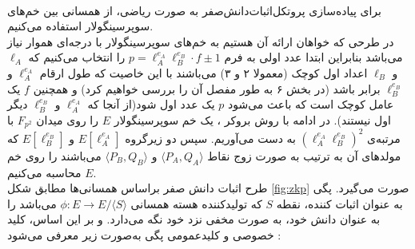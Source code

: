 \\
برای پیاده‌سازی پروتکل‌اثبات‌دانش‌صفر به صورت ریاضی، از همسانی بین  خم‌های سوپرسینگولار استفاده می‌کنیم.  
\\
در طرحی که خواهان ارائه آن هستیم به خم‌های سوپرسینگولار با درجه‌ای هموار
 نیاز می‌باشد بنابراین ابتدا  عدد اولی به فرم 
$p = \ell_A^{e_A} \ell_B^{e_B} \cdot f \pm 1$
را انتخاب می‌کنیم که 
$\ell_A$
و
$\ell_B$
اعداد اول کوچک (معمولا ۲ و ۳) می‌باشند با این خاصیت که طول ارقام
$\ell_A^{e_A}$
و
$\ell_B^{e_B} $
برابر باشد (در بخش ۶ به طور مفصل آن را بررسی خواهیم کرد) و همچنین  
$f$ %
یک عامل کوچک است که باعث می‌شود 
$p$
یک عدد اول شود(از آنجا که 
$\ell_A^{e_A}$
و
$\ell_B^{e_B} $
دیگر اول نیستند). در ادامه ‌با روش بروکر 
\cite{broker}
، یک خم سوپرسینگولار 
$E$
را روی میدان 
$F_{p^2}$
با مرتبه‌ی 
$(\ell_A^{e_A} \ell_B^{e_B})^2$
 به دست می‌آوریم. سپس دو زیرگروه 
$E[\ell_A^{e_A}]$
و
$E[\ell_B^{e_B}]$ 
که مولدهای آن به ترتیب به صورت زوج نقاط
$ \langle P_A,Q_A \rangle $
و
$ \langle P_B,Q_B \rangle  $
می‌باشند را روی خم 
$E$
محاسبه می‌کنیم.
\\
طرح اثبات دانش صفر براساس همسانی‌ها مطابق شکل 
\ref{fig:zkp}
 صورت می‌گیرد. پگی به عنوان اثبات کننده، نقطه 
$S$
که تولیدکننده هسته همسانی 
$\phi : E \longrightarrow E/ \langle S \rangle $
می‌باشد را به عنوان دانش  خود، به صورت مخفی نزد خود نگه  می‌دارد. 
و بر این اساس، کلید خصوصی و کلیدعمومی پگی به‌صورت زیر معرفی می‌شود :

